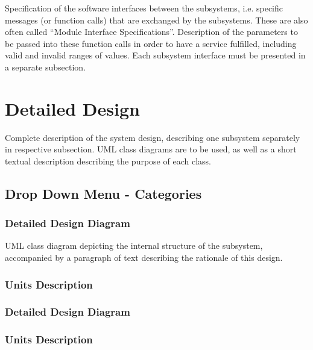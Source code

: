 \documentclass[12pt]{article}
\begin{document}
Specification of the software interfaces between the subsystems,
i.e. specific messages (or function calls) that are exchanged by the subsystems.
These are also often called ``Module Interface Specifications''.
Description of the parameters to be passed into these function calls in order to have a service fulfilled,
including valid and invalid ranges of values.
Each subsystem interface must be presented in a separate subsection.

\section{Detailed Design} \label{sec:detail}

Complete description of the system design, describing one subsystem separately in respective subsection.
UML class diagrams are to be used, as well as a short textual description describing the purpose of each class.

\subsection{Drop Down Menu - Categories}

\subsubsection{Detailed Design Diagram}

UML class diagram depicting the internal structure of the subsystem,
accompanied by a paragraph of text describing the rationale of this design.

\subsubsection{Units Description}

\subsubsection{Detailed Design Diagram}

\subsubsection{Units Description}

\newcommand{\mc}[2]{\multicolumn{#1}{c}{#2}}

\setcounter{secnumdepth}{4}
\end{document}

